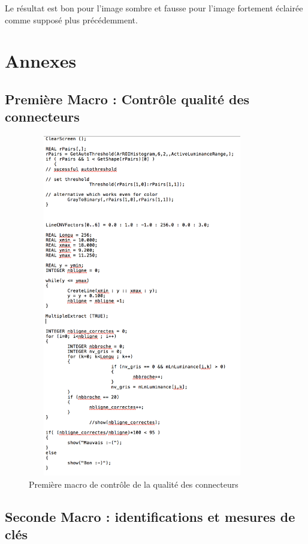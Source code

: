 \documentclass{scrreprt}
\begin{document}
Le résultat est bon pour l'image sombre et fausse pour l'image fortement éclairée comme supposé plus précédemment.

\chapter{Annexes}

\section{Première Macro : Contrôle qualité des connecteurs}

\begin{figure}[!h]
\centering
\includegraphics[width=10cm, height=15cm]{images/first.png}
\caption{Première macro de contrôle de la qualité des connecteurs}
\end{figure}


\newpage
\section{Seconde Macro : identifications et mesures de clés}
\end{document}
